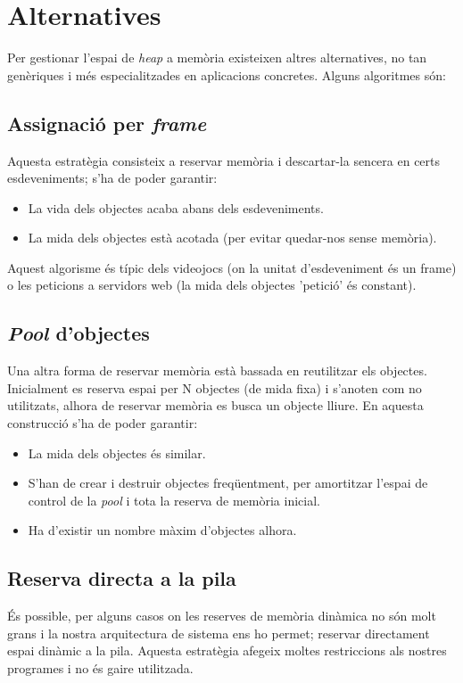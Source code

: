 \begin{minipage}{\textwidth}    %
\section{Alternatives}
Per gestionar l'espai de \textit{heap} a memòria existeixen altres alternatives, no tan genèriques i més especialitzades en aplicacions concretes. Alguns algoritmes són:

\subsection{Assignació per \textit{frame}}
Aquesta estratègia consisteix a reservar memòria i descartar-la sencera en certs esdeveniments; s'ha de poder garantir:
\begin{itemize}
\item La vida dels objectes acaba abans dels esdeveniments.
\item La mida dels objectes està acotada (per evitar quedar-nos sense memòria).
\end{itemize}
Aquest algorisme és típic dels videojocs (on la unitat d'esdeveniment és un frame) o les peticions a servidors web (la mida dels objectes 'petició' és constant).
\end{minipage}

\subsection{\textit{Pool} d'objectes}
Una altra forma de reservar memòria està bassada en reutilitzar els objectes. Inicialment es reserva espai per N objectes (de mida fixa) i s'anoten com no utilitzats, alhora de reservar memòria es busca un objecte lliure. En aquesta construcció s'ha de poder garantir:
\begin{itemize}
\item La mida dels objectes és similar.
\item S'han de crear i destruir objectes freqüentment, per amortitzar l'espai de control de la \textit{pool} i tota la reserva de memòria inicial.
\item Ha d'existir un nombre màxim d'objectes alhora.
\end{itemize}

\subsection{Reserva directa a la pila}
És possible, per alguns casos on les reserves de memòria dinàmica no són molt grans i la nostra arquitectura de sistema ens ho permet; reservar directament espai dinàmic a la pila. Aquesta estratègia afegeix moltes restriccions als nostres programes i no és gaire utilitzada.

